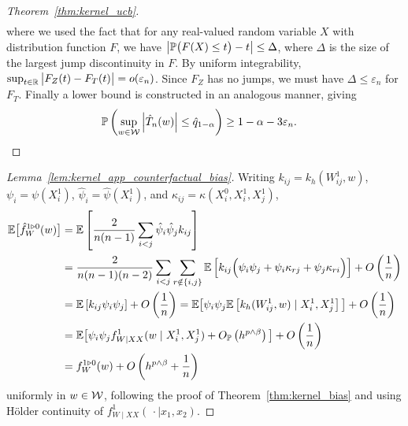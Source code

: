 \begin{proof}[Theorem~\ref{thm:kernel_ucb}]
\begin{align*}
  \end{align*}
  where we used the fact that for any
  real-valued random variable $X$ with distribution function $F$,
  we have
  $\big|\P\big(F(X) \leq t\big) - t\big| \leq \Delta$,
  where $\Delta$ is the size of the
  largest jump discontinuity in $F$.
  By uniform integrability,
  $\sup_{t \in \R} \big| F_Z(t) - F_T(t) \big| = o(\varepsilon_n)$.
  Since $F_Z$ has no jumps,
  we must have $\Delta \leq \varepsilon_n$ for $F_T$.
  Finally a lower bound is constructed in an analogous manner,
  giving
  \begin{align*}
    \P\left(
      \sup_{w \in \cW}
      \left| \hat T_n(w) \right|
      \leq
      \hat q_{1-\alpha}
    \right)
    &\geq
    1 - \alpha - 3\varepsilon_n.
  \end{align*}
\end{proof}

\begin{proof}[Lemma~\ref{lem:kernel_app_counterfactual_bias}]

  Writing
  $k_{i j} = k_h(W_{i j}^1, w)$,
  $\psi_i = \psi(X_i^1)$,
  $\hat\psi_i = \hat\psi(X_i^1)$,
  and $\kappa_{i j} = \kappa(X_i^0, X_i^1, X_j^1)$,
  \begin{align*}
    \E\big[\hat f_W^{1 \triangleright 0}(w)\big]
    &=
    \E\left[
      \frac{2}{n(n-1)}
      \sum_{i<j}
      \hat \psi_i
      \hat \psi_j
      k_{i j}
    \right] \\
    &=
    \frac{2}{n(n-1)(n-2)}
    \sum_{i < j}
    \sum_{r \notin \{i,j\}}
    \E\left[
      k_{i j}
      \Big(
        \psi_i
        \psi_j
        +\psi_i
        \kappa_{r j}
        +\psi_j
        \kappa_{r i}
      \Big)
    \right]
    + O\left(\frac{1}{n}\right) \\
    &=
    \E\left[
      k_{i j}
      \psi_i
      \psi_j
    \right]
    + O\left(\frac{1}{n}\right)
    =
    \E\big[
      \psi_i
      \psi_j
      \E\left[
        k_h(W_{i j}^1, w)
        \mid X_i^1, X_j^1
      \right]
    \big]
    + O\left(\frac{1}{n}\right) \\
    &=
    \E\big[
      \psi_i
      \psi_j
      f_{W \mid XX}^1(w \mid X_i^1, X_j^1)
      + O_\P\left( h^{p \wedge \beta} \right)
    \big]
    + O\left(\frac{1}{n}\right) \\
    &=
    f_W^{1 \triangleright 0}(w)
    + O\left( h^{p \wedge \beta} + \frac{1}{n}\right)
  \end{align*}
  uniformly in $w \in \cW$, following the proof of
  Theorem~\ref{thm:kernel_bias} and using H{\"o}lder continuity
  of $f_{W \mid XX}^1(\,\cdot \mid x_1, x_2)$.
\end{proof}

